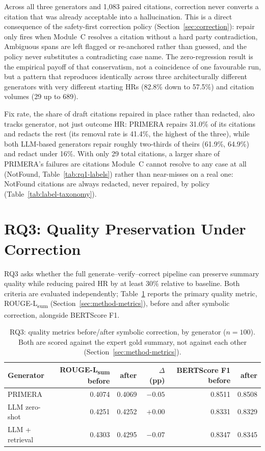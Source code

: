 Across all three generators and 1{,}083 paired citations, correction never converts a citation that was already acceptable into a hallucination. This is a direct consequence of the safety-first correction policy (Section~\ref{sec:correction}): repair only fires when Module~C resolves a citation without a hard party contradiction, Ambiguous spans are left flagged or re-anchored rather than guessed, and the policy never substitutes a contradicting case name. The zero-regression result is the empirical payoff of that conservatism, not a coincidence of one favourable run, but a pattern that reproduces identically across three architecturally different generators with very different starting HRs (82.8\% down to 57.5\%) and citation volumes (29 up to 689).

Fix rate, the share of draft citations repaired in place rather than redacted, also tracks generator, not just outcome HR: PRIMERA repairs 31.0\% of its citations and redacts the rest (its removal rate is 41.4\%, the highest of the three), while both LLM-based generators repair roughly two-thirds of theirs (61.9\%, 64.9\%) and redact under 16\%. With only 29 total citations, a larger share of PRIMERA's failures are citations Module~C cannot resolve to any case at all (NotFound, Table~\ref{tab:rq1-labels}) rather than near-misses on a real one: NotFound citations are always redacted, never repaired, by policy (Table~\ref{tab:label-taxonomy}).

\section{RQ3: Quality Preservation Under Correction}
\label{sec:results-rq3}

RQ3 asks whether the full generate--verify--correct pipeline can preserve summary quality while reducing paired HR by at least 30\% relative to baseline. Both criteria are evaluated independently; Table~\ref{tab:rq3-results} reports the primary quality metric, ROUGE-L\textsubscript{sum} (Section~\ref{sec:method-metrics}), before and after symbolic correction, alongside BERTScore F1.

\begin{table}[!t]
\centering
\caption{RQ3: quality metrics before/after symbolic correction, by generator ($n=100$). Both are scored against the expert gold summary, not against each other (Section~\ref{sec:method-metrics}).}
\label{tab:rq3-results}
\begin{tabular}{@{}lrrrrr@{}}
\toprule
\textbf{Generator} & \textbf{ROUGE-L\textsubscript{sum} before} & \textbf{after} & \textbf{$\Delta$ (pp)} & \textbf{BERTScore F1 before} & \textbf{after} \\
\midrule
PRIMERA         & 0.4074 & 0.4069 & $-0.05$ & 0.8511 & 0.8508 \\
LLM zero-shot    & 0.4251 & 0.4252 & $+0.00$ & 0.8331 & 0.8329 \\
LLM + retrieval  & 0.4303 & 0.4295 & $-0.07$ & 0.8347 & 0.8345 \\
\bottomrule
\end{tabular}
\end{table}

